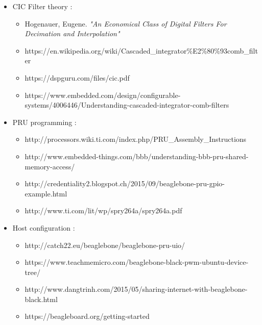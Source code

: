 \documentclass[]{report}
\providecommand{\tightlist}{%
	\setlength{\itemsep}{0pt}\setlength{\parskip}{0pt}}
\begin{document}
\begin{itemize}
\tightlist
\item
  CIC Filter theory :

  \begin{itemize}
  \tightlist
  \item
    Hogenauer, Eugene. \emph{"An Economical Class of Digital Filters
    For Decimation and Interpolation"}
  \item
    https://en.wikipedia.org/wiki/Cascaded\_integrator\%E2\%80\%93comb\_filter
  \item
    https://dspguru.com/files/cic.pdf
  \item
    https://www.embedded.com/design/configurable-systems/4006446/Understanding-cascaded-integrator-comb-filters
  \end{itemize}
\item
  PRU programming :

  \begin{itemize}
  \tightlist
  \item
    http://processors.wiki.ti.com/index.php/PRU\_Assembly\_Instructions
  \item
    http://www.embedded-things.com/bbb/understanding-bbb-pru-shared-memory-access/
  \item
    http://credentiality2.blogspot.ch/2015/09/beaglebone-pru-gpio-example.html
  \item
    http://www.ti.com/lit/wp/spry264a/spry264a.pdf
  \end{itemize}
\item
  Host configuration :

  \begin{itemize}
  \tightlist
  \item
    http://catch22.eu/beaglebone/beaglebone-pru-uio/
  \item
    https://www.teachmemicro.com/beaglebone-black-pwm-ubuntu-device-tree/
  \item
    http://www.dangtrinh.com/2015/05/sharing-internet-with-beaglebone-black.html
  \item
    https://beagleboard.org/getting-started
  \end{itemize}
\end{itemize}
\end{document}
